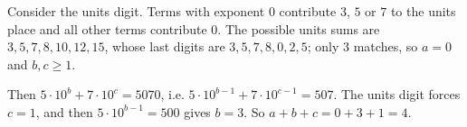 Consider the units digit. Terms with exponent $0$ contribute $3$, $5$ or $7$ to the units place and all other terms contribute $0$. The possible units sums are $3,5,7,8,10,12,15$, whose last digits are $3,5,7,8,0,2,5$; only $3$ matches, so $a=0$ and $b,c\ge1$.

Then $5\cdot10^b+7\cdot10^c=5070$, i.e. $5\cdot10^{b-1}+7\cdot10^{c-1}=507$. The units digit forces $c=1$, and then $5\cdot10^{b-1}=500$ gives $b=3$. So $a+b+c=0+3+1=\boxed{4}$.
